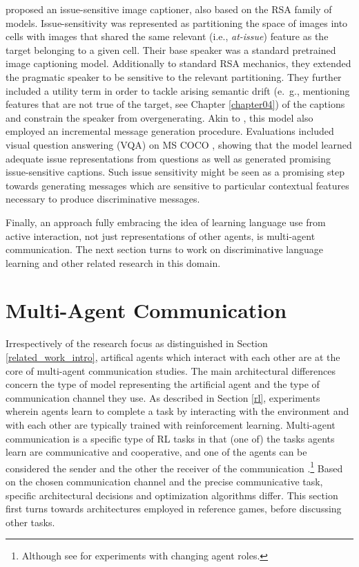 \cite{nie2020pragmatic} proposed an issue-sensitive image captioner, also based on the RSA family of models. Issue-sensitivity was represented as partitioning the space of images into cells with images that shared the same relevant (i.e., \textit{at-issue}) feature as the target belonging to a given cell. Their base speaker was a standard  pretrained image captioning model. Additionally to standard RSA mechanics, they extended the pragmatic speaker to be sensitive to the relevant partitioning. They further included a utility term in order to tackle arising semantic drift (e.~g., mentioning features that are not true of the target, see Chapter \ref{chapter04}) of the captions and constrain the speaker from overgenerating. Akin to \cite{cohn2018pragmatically}, this model also employed an incremental message generation procedure. Evaluations included visual question answering (VQA) on MS COCO \parencite{chen2015microsoft}, showing that the model learned adequate issue representations from questions as well as generated promising issue-sensitive captions. Such issue sensitivity might be seen as a promising step towards generating messages which are sensitive to particular contextual features necessary to produce discriminative messages. 

Finally, an approach fully embracing the idea of learning language use from active interaction, not just representations of other agents,  is multi-agent communication. The next section turns to work on discriminative language learning and other related research in this domain.

\section{Multi-Agent Communication}
\label{mac}
Irrespectively of the research focus as distinguished in Section \ref{related_work_intro}, artifical agents which interact with each other are at the core of multi-agent communication studies.
The main architectural differences concern the type of model representing the artificial agent and the type of communication channel they use.
As described in Section \ref{rl}, experiments wherein agents learn to complete a task by interacting with the environment and with each other are typically trained with reinforcement learning. Multi-agent communication is a specific type of RL tasks in that (one of) the tasks agents learn are communicative and cooperative, and one of the agents can be considered the sender and the other the receiver of the communication \parencite[cf.][]{tan1993multi, lazaridou2016multi}.\footnote{Although see \cite{bouchacourt2019miss} for experiments with changing agent roles.}
Based on the chosen communication channel and the precise communicative task, specific architectural decisions and optimization algorithms differ. This section first turns towards architectures employed in reference games, before discussing other tasks.

